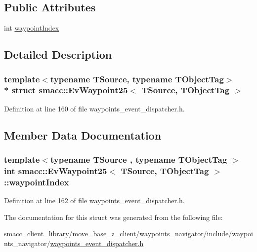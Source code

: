 \subsection*{Public Attributes}
\begin{DoxyCompactItemize}
\item 
int \hyperlink{structsmacc_1_1EvWaypoint25_a187a068dc766e24d800e632a8984cd0e}{waypoint\+Index}
\end{DoxyCompactItemize}


\subsection{Detailed Description}
\subsubsection*{template$<$typename T\+Source, typename T\+Object\+Tag$>$\\*
struct smacc\+::\+Ev\+Waypoint25$<$ T\+Source, T\+Object\+Tag $>$}



Definition at line 160 of file waypoints\+\_\+event\+\_\+dispatcher.\+h.



\subsection{Member Data Documentation}
\subsubsection[{\texorpdfstring{waypoint\+Index}{waypointIndex}}]{\setlength{\rightskip}{0pt plus 5cm}template$<$typename T\+Source , typename T\+Object\+Tag $>$ int {\bf smacc\+::\+Ev\+Waypoint25}$<$ T\+Source, T\+Object\+Tag $>$\+::waypoint\+Index}\hypertarget{structsmacc_1_1EvWaypoint25_a187a068dc766e24d800e632a8984cd0e}{}\label{structsmacc_1_1EvWaypoint25_a187a068dc766e24d800e632a8984cd0e}


Definition at line 162 of file waypoints\+\_\+event\+\_\+dispatcher.\+h.



The documentation for this struct was generated from the following file\+:\begin{DoxyCompactItemize}
\item 
smacc\+\_\+client\+\_\+library/move\+\_\+base\+\_\+z\+\_\+client/waypoints\+\_\+navigator/include/waypoints\+\_\+navigator/\hyperlink{waypoints__event__dispatcher_8h}{waypoints\+\_\+event\+\_\+dispatcher.\+h}\end{DoxyCompactItemize}
